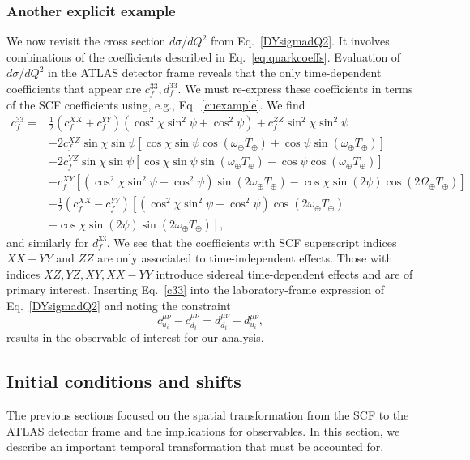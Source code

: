 \subsubsection{Another explicit example}
\label{sec:phase_comp1}
%
%
We now revisit the cross section $d\sigma/dQ^2$ from Eq.~\eqref{DYsigmadQ2}.
It involves combinations of the coefficients
described in Eq.~\eqref{eq:quarkcoeffs}. Evaluation of $d\sigma/dQ^2$ in the
ATLAS detector frame reveals that the only time-dependent
coefficients that appear are $c_f^{33}, d_f^{33}$. We must re-express
these coefficients in terms of the SCF 
coefficients using, e.g., Eq.~\eqref{cuexample}. 
We find
%
\begin{align}
\label{c33}
c_{f}^{33} =&
\frac{1}{2}(c_{f}^{XX} + c_{f}^{YY})\left(\cos^2\chi\sin^2\psi + \cos^2\psi\right) +  c_{f}^{ZZ}\sin^2\chi\sin^2\psi
\nonumber\\
& - 2c_{f}^{XZ}\sin\chi\sin\psi
\left[\cos\chi\sin\psi\cos(\omega_{\oplus}T_{\oplus} )
+ \cos\psi\sin(\omega_{\oplus}T_{\oplus})\right]
\nonumber\\
& - 2c_{f}^{YZ}\sin\chi\sin\psi
\left[\cos\chi\sin\psi\sin(\omega_{\oplus}T_{\oplus})
- \cos\psi\cos(\omega_{\oplus}T_{\oplus})\right] \nonumber\\
& + c_{f}^{XY}\left[(\cos^2\chi\sin^2\psi - \cos^2\psi)\sin(2\omega_\oplus T_\oplus) - \cos\chi\sin(2\psi)\cos(2\Omega_\oplus T_\oplus)    \right] \nonumber \\
& +\frac{1}{2}(c_{f}^{XX} - c_{f}^{YY})\left[(\cos^2\chi\sin^2\psi - \cos^2\psi)\cos(2\omega_\oplus T_\oplus) \right. \nonumber\\
& \left.+ \cos\chi\sin(2\psi)\sin(2\omega_\oplus T_\oplus)\right],
\end{align}
%
and similarly for $d_f^{33}$. 
We see that the coefficients with SCF superscript 
indices $XX+YY$ and $ZZ$ are only associated to time-independent effects. 
Those with indices $XZ, YZ, XY, XX-YY$ introduce 
sidereal time-dependent effects and are of primary interest.
Inserting 
Eq.~\eqref{c33} into the laboratory-frame
expression of Eq.~\eqref{DYsigmadQ2} and
noting the constraint
%
\begin{equation}
c_{u_i}^{\mu\nu} - c_{d_i}^{\mu\nu} = d_{d_i}^{\mu\nu} - d_{u_i}^{\mu\nu},
\end{equation}
%
results in the observable of interest for our analysis.
%
%
\subsection{Initial conditions and shifts}
\label{sec:timeshift}
%
%
The previous sections focused on the spatial transformation from the 
SCF to the ATLAS detector frame and the implications for observables. 
In this section, we describe an important temporal transformation
that must be accounted for.

